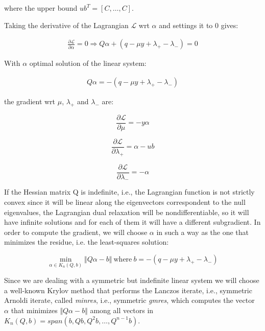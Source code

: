 where the upper bound $ub^T = [C, \dots, C]$.

Taking the derivative of the Lagrangian $\mathcal{L}$ wrt $\alpha$ and settings it to 0 gives:

\begin{align*}
	\frac{\partial \mathcal{L}}{\partial \alpha}=0\Rightarrow Q \alpha + (q - \mu y + \lambda_+ - \lambda_-) = 0 \tag{1.25}
\end{align*}

With $\alpha$ optimal solution of the linear system:

\begin{align*}
    Q \alpha = - (q - \mu y + \lambda_+ - \lambda_-) \tag{1.26}
\end{align*}

the gradient wrt $\mu$, $\lambda_+$ and $\lambda_-$ are:

\begin{equation}
	\frac{\partial \mathcal{L}}{\partial \mu}=-y \alpha \tag{1.27}
\end{equation}

\begin{equation}
	\frac{\partial \mathcal{L}}{\partial \lambda_+}=\alpha - ub \tag{1.28}
\end{equation}

\begin{equation}
    \frac{\partial \mathcal{L}}{\partial \lambda_-}=-\alpha \tag{1.29}
\end{equation}

If the Hessian matrix Q is indefinite, i.e., the Lagrangian function is not strictly convex since it will be linear along the eigenvectors correspondent to the null eigenvalues, the Lagrangian dual relaxation will be nondifferentiable, so it will have infinite solutions and for each of them it will have a different subgradient. In order to compute the gradient, we will choose $\alpha$ in such a way as the one that minimizes the residue, i.e. the least-squares solution:

\begin{equation}
	\min_{\alpha \in K_n(Q, b)} \Vert Q \alpha - b \Vert \ \text{where} \ b = - (q - \mu y + \lambda_+ - \lambda_-) \tag{1.30}
\end{equation}

Since we are dealing with a symmetric but indefinite linear system we will choose a well-known Krylov method that performs the Lanczos iterate, i.e., symmetric Arnoldi iterate, called \emph{minres}, i.e., symmetric \emph{gmres}, which computes the vector $\alpha$ that minimizes $\Vert Q \alpha - b \Vert$ among all vectors in $K_n(Q, b) = span(b, Qb, Q^2b, \dots, Q^{n-1}b)$.


